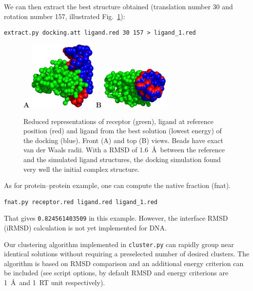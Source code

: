 \documentclass[12pt,a4paper]{article}
\begin{document}
We can then extract the best structure obtained (translation number 30 
and rotation number 157, illustrated Fig.~\ref{1K79_dock}):

\begin{verbatim}
extract.py docking.att ligand.red 30 157 > ligand_1.red
\end{verbatim}

\begin{figure}[htbp]
\center
{\textbf A}
\includegraphics*[width=0.30\textwidth]{img/1K79_dock1_front.png}
\hspace*{2cm}
{\textbf B}
\includegraphics*[width=0.30\textwidth]{img/1K79_dock1_top.png}
\caption{Reduced representations of receptor (green), ligand at reference 
position (red) and ligand from the best solution (lowest energy) of the 
docking (blue). Front (A) and top (B) views. Beads have exact van der Waals 
radii. With a RMSD of 1.6~\AA\ between the reference and the simulated ligand 
structures, the docking simulation found very well the initial complex 
structure.}
\label{1K79_dock}
\end{figure}

As for protein--protein example, one can compute the native fraction (fnat).
\begin{verbatim}
fnat.py receptor.red ligand.red ligand_1.red
\end{verbatim}

That gives {\tt 0.824561403509} in this example. However, the interface 
RMSD (iRMSD) calculation is not yet implemented for DNA.


Our clustering algorithm implemented in {\tt cluster.py} can rapidly group
near identical solutions without requiring a preselected number of desired clusters.
The algorithm is based on RMSD comparison and an additional energy criterion can 
be included (see script options, by default RMSD and energy criterions are 
1~\AA\ and 1~RT unit respectively).
\end{document}
